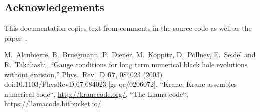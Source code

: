 \subsection{Acknowledgements}
This documentation copies text from comments in the source code as well
as the paper~\cite{EinsteinEvolve_NewRad_Alcubierre:2002kk}.

\begin{thebibliography}{9}
  M.~Alcubierre, B.~Bruegmann, P.~Diener, M.~Koppitz, D.~Pollney, E.~Seidel and R.~Takahashi,
  ``Gauge conditions for long term numerical black hole evolutions without excision,''
  Phys.\ Rev.\ D {\bf 67}, 084023 (2003)
  doi:10.1103/PhysRevD.67.084023
  [gr-qc/0206072].
 ``Kranc: Kranc assembles
numerical code``, \url{http://kranccode.org/}.
 ``The Llama code``, \url{https://llamacode.bitbucket.io/}.

\end{thebibliography}



